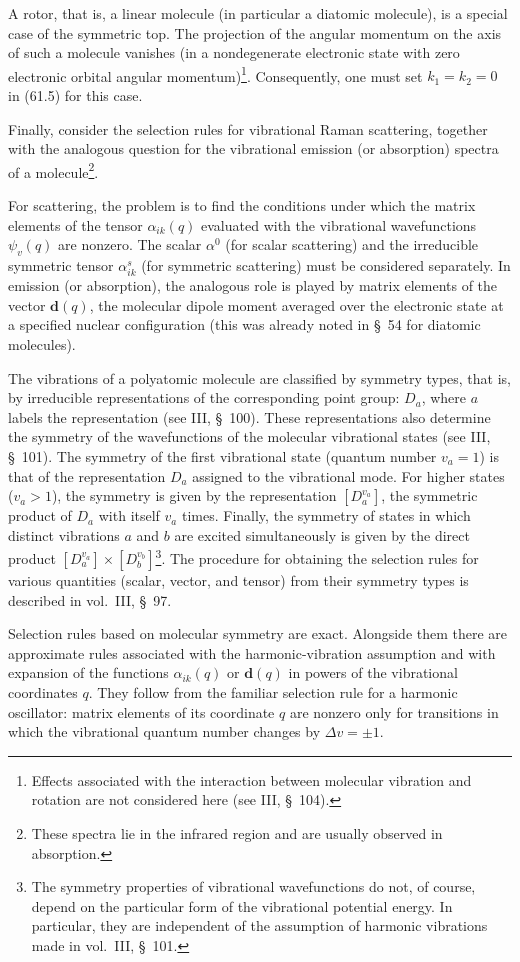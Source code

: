 A rotor, that is, a linear molecule (in particular a diatomic molecule), is a special case of the symmetric top. The projection of the angular momentum on the axis of such a molecule vanishes (in a nondegenerate electronic state with zero electronic orbital angular momentum)\footnote{Effects associated with the interaction between molecular vibration and rotation are not considered here (see III, \S~104).}. Consequently, one must set $k_1=k_2=0$ in (61.5) for this case.

Finally, consider the selection rules for vibrational Raman scattering, together with the analogous question for the vibrational emission (or absorption) spectra of a molecule\footnote{These spectra lie in the infrared region and are usually observed in absorption.}.

For scattering, the problem is to find the conditions under which the matrix elements of the tensor $\alpha_{ik}(q)$ evaluated with the vibrational wavefunctions $\psi_v(q)$ are nonzero. The scalar $\alpha^0$ (for scalar scattering) and the irreducible symmetric tensor $\alpha^s_{ik}$ (for symmetric scattering) must be considered separately. In emission (or absorption), the analogous role is played by matrix elements of the vector $\mathbf d(q)$, the molecular dipole moment averaged over the electronic state at a specified nuclear configuration (this was already noted in \S~54 for diatomic molecules).

The vibrations of a polyatomic molecule are classified by symmetry types, that is, by irreducible representations of the corresponding point group: $D_a$, where $a$ labels the representation (see III, \S~100). These representations also determine the symmetry of the wavefunctions of the molecular vibrational states (see III, \S~101). The symmetry of the first vibrational state (quantum number $v_a=1$) is that of the representation $D_a$ assigned to the vibrational mode. For higher states ($v_a>1$), the symmetry is given by the representation $[D_a^{v_a}]$, the symmetric product of $D_a$ with itself $v_a$ times. Finally, the symmetry of states in which distinct vibrations $a$ and $b$ are excited simultaneously is given by the direct product $[D_a^{v_a}]\times[D_b^{v_b}]$\footnote{The symmetry properties of vibrational wavefunctions do not, of course, depend on the particular form of the vibrational potential energy. In particular, they are independent of the assumption of harmonic vibrations made in vol.~III, \S~101.}. The procedure for obtaining the selection rules for various quantities (scalar, vector, and tensor) from their symmetry types is described in vol.~III, \S~97.

Selection rules based on molecular symmetry are exact. Alongside them there are approximate rules associated with the harmonic-vibration assumption and with expansion of the functions $\alpha_{ik}(q)$ or $\mathbf d(q)$ in powers of the vibrational coordinates $q$. They follow from the familiar selection rule for a harmonic oscillator: matrix elements of its coordinate $q$ are nonzero only for transitions in which the vibrational quantum number changes by $\Delta v=\pm1$.
